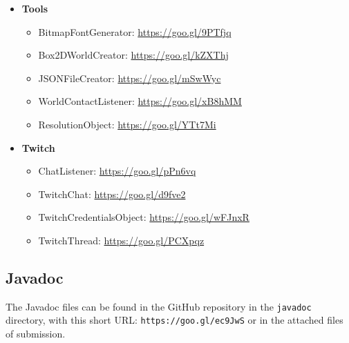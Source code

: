 \documentclass[12p]{article}
\begin{document}
\begin{itemize}
  \item \textbf{Tools}
  \begin{itemize}
    \item BitmapFontGenerator: \url{https://goo.gl/9PTfjq}
    \item Box2DWorldCreator: \url{https://goo.gl/kZXThj}
    \item JSONFileCreator: \url{https://goo.gl/mSwWyc}
    \item WorldContactListener: \url{https://goo.gl/xB8hMM}
    \item ResolutionObject: \url{https://goo.gl/YTt7Mi}
  \end{itemize}
  
  \item \textbf{Twitch}
  \begin{itemize}
    \item ChatListener: \url{https://goo.gl/pPn6vq}
    \item TwitchChat: \url{https://goo.gl/d9fve2}
    \item TwitchCredentialsObject: \url{https://goo.gl/wFJnxR}
    \item TwitchThread: \url{https://goo.gl/PCXpqz}
  \end{itemize}
\end{itemize}


\subsection{Javadoc} \label{Javadoc}

The Javadoc files can be found in the GitHub repository in the \texttt{javadoc} directory, with this short URL: \texttt{https://goo.gl/ec9JwS} or in the attached files of submission.

\end{document}

